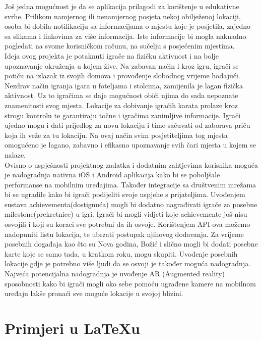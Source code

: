 		\textnormal{Još jedna mogućnost je da se aplikacija prilagodi za korištenje u edukativne svrhe. Prilikom namjernog ili nenamjernog posjeta nekoj obilježenoj lokaciji, osoba bi dobila notifikaciju sa informacijama o mjestu koje je posjetila, zajedno sa slikama i linkovima za više informacija. Iste informacije bi mogla naknadno pogledati na svome korisničkom računu, na sučelju s posjećenim mjestima.}\\
		
		\textnormal{Ideja ovog projekta je potaknuti igrače na fizičku aktivnost i na bolje upoznavanje okruženja u kojem žive. Na zabavan način i kroz igru, igrači se potiču na izlazak iz svojih domova i provođenje slobodnog vrijeme hodajući. Nezdrav način igranja igara u foteljama i stolcima, zamijenila je lagan fizička aktivnost. Uz to igračima se daje mogućnost obići njima do sada nepoznate znamenitosti svog mjesta. Lokacije za dobivanje igraćih karata prolaze kroz strogu kontrolu te garantiraju točne i igračima zanimljive informacije. Igrači ujedno mogu i dati prijedlog za novu lokaciju i time sačuvati od zaborava priču koja ih veže za tu lokaciju. Na ovaj način svim posjetiteljima tog mjesta omogućeno je lagano, zabavno i efikasno upoznavanje svih čari mjesta u kojem se nalaze.}\\
		
		\textnormal{Ovisno o uspješnosti projektnog zadatka i dodatnim zahtjevima korisnika moguća je nadogradnja nativna iOS i Android aplikacija kako bi se poboljšale performanse na mobilnim uređajima. Također integracije sa društvenim mrežama bi se ugradile kako bi igrači podijeliti svoje uspjehe s prijateljima. Uvođenjem sustava achievementa(dostignuća) mogli bi dodatno nagrađivati igrače za posebne milestone(prekretnice) u igri. Igrači bi mogli vidjeti koje achievemente još nisu osvojili i koji su koraci sve potrebni da ih osvoje. Korištenjem API-ova možemo nadopuniti listu lokacija, te ubrzati postupak njihovog dodavanja. Za vrijeme posebnih događaja kao što su Nova godina, Božić i slično mogli bi dodati posebne karte koje se samo tada, u kratkom roku, mogu skupiti. Uvođenje posebnih lokacije gdje je potrebno više ljudi da se osvoji je također moguća nadogradnja. Najveća potencijalna nadogradnja je uvođenje AR (Augmented reality) sposobnosti kako bi igrači mogli oko sebe pomoću ugrađene kamere na mobilnom uređaju lakše pronaći sve moguće lokacije u svojoj blizini.}
		
		\eject
		
		\section{Primjeri u \LaTeX u}
		
